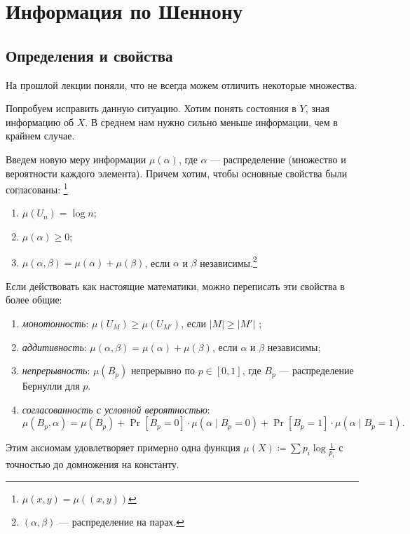 \chapter{Информация по Шеннону}
\section{Определения и свойства}
На прошлой лекции поняли, что не всегда можем отличить некоторые множества.

Попробуем исправить данную ситуацию. Хотим понять состояния в $ Y$, зная информацию об $ X$. В среднем нам нужно сильно меньше информации, чем в крайнем случае.

Введем новую меру информации $  \mu ( \alpha )$, где $  \alpha $ --- распределение (множество и вероятности каждого элемента). Причем хотим, чтобы основные свойства были согласованы: \footnote{$ \mu(x, y) = \mu((x, y))$}
\begin{enumerate}
	\item $  \mu(U_n) = \log n$;
	\item $ \mu( \alpha ) \ge 0$;
	\item $\mu ( \alpha,  \beta ) = \mu ( \alpha ) + \mu ( \beta )$, если  $  \alpha $ и $  \beta $ независимы.\footnote{$( \alpha,  \beta )$ --- распределение на парах.}
\end{enumerate} 
Если действовать как настоящие математики, можно переписать эти свойства в более общие:
\begin{enumerate}
	\item \textit{монотонность}: $ \mu(U_{M}) \ge \mu(U_{M'})$, если $ \lvert M \rvert \ge \lvert M' \rvert $ ;
	\item \textit{аддитивность}: $\mu ( \alpha,  \beta ) = \mu ( \alpha ) + \mu ( \beta )$, если  $  \alpha $ и $  \beta $ независимы;
	\item \textit{непрерывность}: $ \mu(B_p)$ непрерывно по $ p \in [0, 1]$, где $ B_p  $ --- распределение Бернулли для $ p$. 
	\item \textit{согласованность с условной вероятностью}: 
		$$ \mu(B_p, \alpha ) = \mu(B_p) + \Pr[B_p = 0]\cdot \mu( \alpha \mid B_p = 0) + \Pr[B_p = 1]\cdot \mu( \alpha \mid B_p = 1).$$
\end{enumerate} 
Этим аксиомам удовлетворяет примерно одна функция $  \mu(X) \coloneqq \sum p_i \log \frac{1}{ p_i} $ с точностью до домножения на константу.

